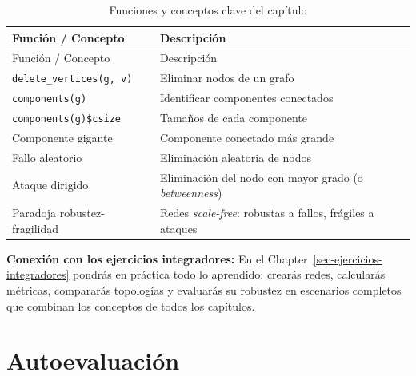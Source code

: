 \documentclass[
  letterpaper,
  DIV=11,
  numbers=noendperiod]{scrreprt}
\begin{document}
\begin{longtable}[]{@{}
  >{\raggedright\arraybackslash}p{}
  >{\raggedright\arraybackslash}p{}@{}}
\caption{Funciones y conceptos clave del capítulo}\tabularnewline
\toprule\noalign{}
\begin{minipage}[b]{\linewidth}\raggedright
Función / Concepto
\end{minipage} & \begin{minipage}[b]{\linewidth}\raggedright
Descripción
\end{minipage} \\
\midrule\noalign{}
\endfirsthead
\toprule\noalign{}
\begin{minipage}[b]{\linewidth}\raggedright
Función / Concepto
\end{minipage} & \begin{minipage}[b]{\linewidth}\raggedright
Descripción
\end{minipage} \\
\midrule\noalign{}
\endhead
\bottomrule\noalign{}
\endlastfoot
\texttt{delete\_vertices(g,\ v)} & Eliminar nodos de un grafo \\
\texttt{components(g)} & Identificar componentes conectados \\
\texttt{components(g)\$csize} & Tamaños de cada componente \\
Componente gigante & Componente conectado más grande \\
Fallo aleatorio & Eliminación aleatoria de nodos \\
Ataque dirigido & Eliminación del nodo con mayor grado (o
\emph{betweenness}) \\
Paradoja robustez-fragilidad & Redes \emph{scale-free}: robustas a
fallos, frágiles a ataques \\
\end{longtable}

\textbf{Conexión con los ejercicios integradores:} En el
Chapter~\ref{sec-ejercicios-integradores} pondrás en práctica todo lo
aprendido: crearás redes, calcularás métricas, compararás topologías y
evaluarás su robustez en escenarios completos que combinan los conceptos
de todos los capítulos.

\section*{Autoevaluación}\label{autoevaluaciuxf3n-4}
\end{document}
